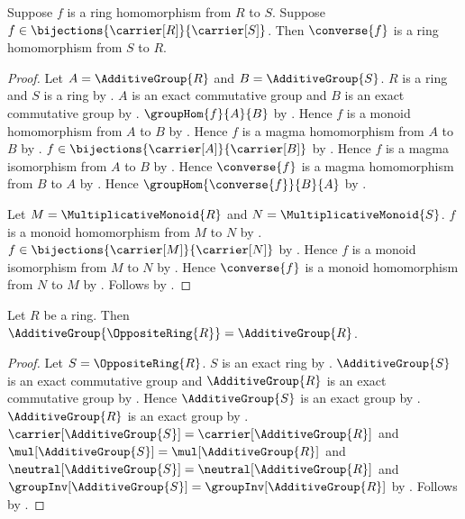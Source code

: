 \begin{theorem}\label{bijective_ring_hom_converse}
    Suppose $f$ is a ring homomorphism from $R$ to $S$.
    Suppose $f\in\bijections{\carrier[R]}{\carrier[S]}$.
    Then $\converse{f}$ is a ring homomorphism from $S$ to $R$.
\end{theorem}
\begin{proof}
    Let $A=\AdditiveGroup{R}$ and $B=\AdditiveGroup{S}$.
    $R$ is a ring and $S$ is a ring by
        .
    $A$ is an exact commutative group and
        $B$ is an exact commutative group by
        .
    $\groupHom{f}{A}{B}$ by
        .
    Hence $f$ is a monoid homomorphism from $A$ to $B$ by
        .
    Hence $f$ is a magma homomorphism from $A$ to $B$ by
        .
    $f\in\bijections{\carrier[A]}{\carrier[B]}$ by
        .
    Hence $f$ is a magma isomorphism from $A$ to $B$ by
        .
    Hence $\converse{f}$ is a magma homomorphism from $B$ to $A$ by
        .
    Hence $\groupHom{\converse{f}}{B}{A}$ by
        .

    Let $M=\MultiplicativeMonoid{R}$ and
        $N=\MultiplicativeMonoid{S}$.
    $f$ is a monoid homomorphism from $M$ to $N$ by
        .
    $f\in\bijections{\carrier[M]}{\carrier[N]}$ by
        .
    Hence $f$ is a monoid isomorphism from $M$ to $N$ by
        .
    Hence $\converse{f}$ is a monoid homomorphism from $N$ to $M$ by
        .
    Follows by .
\end{proof}

\begin{theorem}\label{opposite_ring_additive_group}
    Let $R$ be a ring.
    Then $\AdditiveGroup{\OppositeRing{R}}=\AdditiveGroup{R}$.
\end{theorem}
\begin{proof}
    Let $S=\OppositeRing{R}$.
    $S$ is an exact ring by .
    $\AdditiveGroup{S}$ is an exact commutative group and
        $\AdditiveGroup{R}$ is an exact commutative group by
        .
    Hence $\AdditiveGroup{S}$ is an exact group by
        .
    $\AdditiveGroup{R}$ is an exact group by
        .
    $\carrier[\AdditiveGroup{S}]=\carrier[\AdditiveGroup{R}]$ and
        $\mul[\AdditiveGroup{S}]=\mul[\AdditiveGroup{R}]$ and
        $\neutral[\AdditiveGroup{S}]=\neutral[\AdditiveGroup{R}]$ and
        $\groupInv[\AdditiveGroup{S}]=
            \groupInv[\AdditiveGroup{R}]$ by
        .
    Follows by .
\end{proof}

